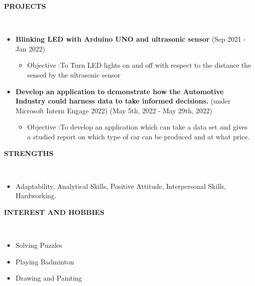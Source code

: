 \documentclass[a4paper,10pt]{article}
\newcommand{\isep}{-2 pt}
\newcommand{\lsep}{-0.5cm}
\newcommand{\resheading}[1]{{\small \colorbox{mygrey}{\begin{minipage}{0.975\textwidth}{\textbf{#1 \vphantom{p\^{E}}}}\end{minipage}}}}
\begin{document}
\resheading{\textbf{PROJECTS} }\\[\lsep]
\begin{itemize}
\item \textbf{Blinking LED with Arduino UNO and ultrasonic sensor} { (Sep 2021 -Jan 2022) } 
\begin{itemize}\itemsep \isep
\item Objective :To Turn LED lights on and off with respect to the distance the sensed by the ultrasonic sensor\\
\end{itemize}
\item \textbf{Develop an application to demonstrate how the Automotive Industry could harness data to take informed decisions.} {(under Microsoft Intern Engage 2022) } {(May 5th, 2022 - May 29th, 2022)}
\begin{itemize}\itemsep \isep
\item Objective :To develop an application which can take a data set and gives a studied report on which type of car can be produced and at what price.\\
\end{itemize}
 
	\end{itemize}

\resheading{\textbf{STRENGTHS} }\\[\lsep]
\begin{itemize}
\item \noindent Adaptability, Analytical Skills, Positive Attitude, Interpersonal Skills, Hardworking.
\end{itemize}

\resheading{\textbf{INTEREST AND HOBBIES} }\\[\lsep]
\begin{itemize}
\item \noindent Solving Puzzles
\item \noindent Playing Badminton
\item \noindent Drawing and Painting

\end{itemize}
\end{document}
